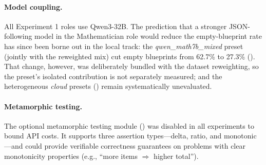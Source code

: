 \documentclass[11pt,a4paper]{article}
\begin{document}
\paragraph{Model coupling.}
All Experiment 1 roles use Qwen3-32B.
The prediction that a stronger JSON-following model in the Mathematician role would reduce the empty-blueprint rate has since been borne out in the local track: the \textit{qwen\_math7b\_mixed} preset (jointly with the reweighted mix) cut empty blueprints from 62.7\% to 27.3\% ().
That change, however, was deliberately bundled with the dataset reweighting, so the preset's isolated contribution is not separately measured; and the heterogeneous \emph{cloud} presets () remain systematically unevaluated.
\paragraph{Metamorphic testing.}
The optional metamorphic testing module () was disabled in all experiments to bound API costs.
It supports three assertion types---delta, ratio, and monotonic---and could provide verifiable correctness guarantees on problems with clear monotonicity properties (e.g., ``more items $\Rightarrow$ higher total'').
\end{document}
